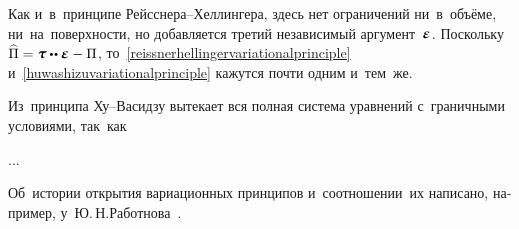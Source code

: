 \begin{otherlanguage}{russian}
Как и~в~принципе Рейсснера\hbox{--}Хеллингера, здесь нет ограничений ни~в~объёме, ни~на~поверхности, но добавляется третий независимый аргумент~$\mathboldepsilon$. Поскольку ${\widehat{\Pi} = \mathboldtau \dotdotp \mathboldepsilon - \Pi}$, то~\eqref{reissnerhellingervariationalprinciple} и~\eqref{huwashizuvariationalprinciple} кажутся почти одним и~тем~же.

Из~принципа Ху\hbox{--}Васидзу вытекает вся полная система уравнений с~граничными условиями, так~как

...


Об~истории открытия вариационных принципов и~соотношении~их написано, например, у~Ю.\,Н.\;Работнова~\cite{rabotnov-mechanicsofdeformable}.

\end{otherlanguage}



